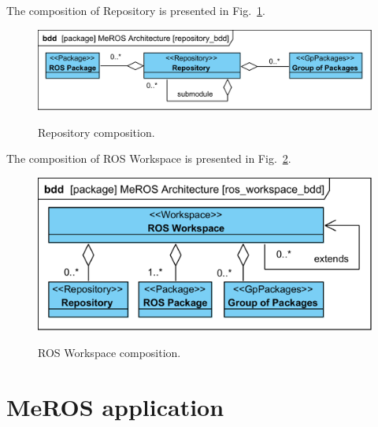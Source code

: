 \documentclass[11pt,oneside,a4paper]{report}
\begin{document}
		
%
	
The composition of Repository is presented in Fig.~\ref{fig:repository_bdd}.	
	
	\begin{figure}[H]
		\centering
		\begin{center}
			{\includegraphics[scale=1.0]{diagrams/repository_bdd.png}}
		\end{center}
		\caption{Repository composition.} 
		\label{fig:repository_bdd}
	\end{figure}

The composition of ROS Workspace is presented in Fig.~\ref{fig:ros_workspace_bdd}.

	\begin{figure}[H]
		\centering
		\begin{center}
			{\includegraphics[scale=1.0]{diagrams/ros_workspace_bdd.png}}
		\end{center}
		\caption{ROS Workspace composition.} 
		\label{fig:ros_workspace_bdd}
	\end{figure}

	
\chapter{MeROS application}
\label{ch:application}
	
\end{document}
